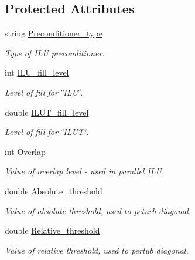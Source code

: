 \subsection*{Protected Attributes}
\begin{DoxyCompactItemize}
\item 
string \hyperlink{classoomph_1_1TrilinosIFPACKPreconditioner_a807a638ddbc59652317930ad534025a6}{Preconditioner\+\_\+type}
\begin{DoxyCompactList}\small\item\em Type of I\+LU preconditioner. \end{DoxyCompactList}\item 
int \hyperlink{classoomph_1_1TrilinosIFPACKPreconditioner_a83ef805357717dc6cceaf898accde484}{I\+L\+U\+\_\+fill\+\_\+level}
\begin{DoxyCompactList}\small\item\em Level of fill for \char`\"{}\+I\+L\+U\char`\"{}. \end{DoxyCompactList}\item 
double \hyperlink{classoomph_1_1TrilinosIFPACKPreconditioner_aac3f70af80ca8db088180b5f972504bc}{I\+L\+U\+T\+\_\+fill\+\_\+level}
\begin{DoxyCompactList}\small\item\em Level of fill for \char`\"{}\+I\+L\+U\+T\char`\"{}. \end{DoxyCompactList}\item 
int \hyperlink{classoomph_1_1TrilinosIFPACKPreconditioner_ad146870260bdc5b56d31b305f824bb2a}{Overlap}
\begin{DoxyCompactList}\small\item\em Value of overlap level -\/ used in parallel I\+LU. \end{DoxyCompactList}\item 
double \hyperlink{classoomph_1_1TrilinosIFPACKPreconditioner_a1ec0009ab938b2981b388e74d91e2105}{Absolute\+\_\+threshold}
\begin{DoxyCompactList}\small\item\em Value of absolute threshold, used to peturb diagonal. \end{DoxyCompactList}\item 
double \hyperlink{classoomph_1_1TrilinosIFPACKPreconditioner_ab8ff6d7a83c6c0c27ede4bd35b3d5628}{Relative\+\_\+threshold}
\begin{DoxyCompactList}\small\item\em Value of relative threshold, used to pertub diagonal. \end{DoxyCompactList}\end{DoxyCompactItemize}
